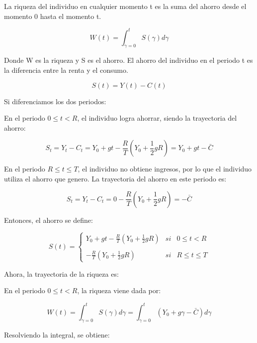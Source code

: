 \documentclass[
]{article}
\begin{document}
La riqueza del individuo en cualquier momento t es la suma del ahorro
desde el momento 0 hasta el momento t.

\begin{equation}
W(t)=\int_{\gamma=0}^{t}S(\gamma)d\gamma
\end{equation}

Donde W es la riqueza y S es el ahorro. El ahorro del individuo en el
periodo t es la diferencia entre la renta y el consumo.

\begin{equation}
S(t)=Y(t)-C(t)
\end{equation}

Si diferenciamos los dos periodos:

En el periodo \(0\leq t<R\), el individuo logra ahorrar, siendo la
trayectoria del ahorro:

\begin{equation}
S_t=Y_t-C_t=Y_0+gt-\frac {R}{T} (Y_0+\frac{1}{2}gR)=Y_0+gt-\bar C
\end{equation}

En el periodo \(R\leq t \leq T\), el individuo no obtiene ingresos, por
lo que el individuo utiliza el ahorro que genero. La trayectoria del
ahorro en este periodo es:

\begin{equation}
S_t=Y_t-C_t=0-\frac {R}{T} (Y_0+\frac{1}{2}gR)=-\bar C
\end{equation}

Entonces, el ahorro se define:

\begin{equation}
S(t)=\left\{ \begin{array}{lcc}
              Y_0+gt-\frac {R}{T} (Y_0+\frac{1}{2}gR) &   si  & 0\leq t<R \\
            \\ -\frac {R}{T} (Y_0+\frac{1}{2}gR) &  si  & R\leq t \leq T
             \end{array}
   \right.
\end{equation}

Ahora, la trayectoria de la riqueza es:

En el periodo \(0\leq t<R\), la riqueza viene dada por:

\begin{equation}
W(t)=\int_{\gamma=0}^{t}S(\gamma)d\gamma=\int_{\gamma=0}^{t}(Y_0+g\gamma-\bar C) d\gamma
\end{equation}

Resolviendo la integral, se obtiene:
\end{document}
